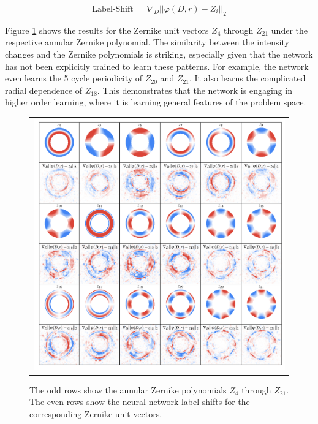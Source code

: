 \begin{equation*}
\text{Label-Shift}\ = \nabla_D || \varphi(D, r) - Z_i||_2
\end{equation*}

Figure \ref{fig:label-shift} shows the results for the Zernike unit vectors $Z_4$ through $Z_{21}$ under the respective annular Zernike polynomial. The similarity between the intensity changes and the Zernike polynomials is striking, especially given that the network has not been explicitly trained to learn these patterns. For example, the network even learns the 5 cycle periodicity of $Z_{20}$ and $Z_{21}$. It also learns the complicated radial dependence of $Z_{18}$. This demonstrates that the network is engaging in higher order learning, where it is learning general features of the problem space.

\begin{figure}[!htbp]
\begin{center}
\begin{tabular}{c}
\includegraphics[width=\textwidth]{figs/cnn/morph.png}
\end{tabular}
\end{center}
\caption[Neural Network Label-Shifts]{The odd rows show the annular Zernike polynomials $Z_4$ through $Z_{21}$. The even rows show the neural network label-shifts for the corresponding Zernike unit vectors. \label{fig:label-shift}}
\end{figure}

